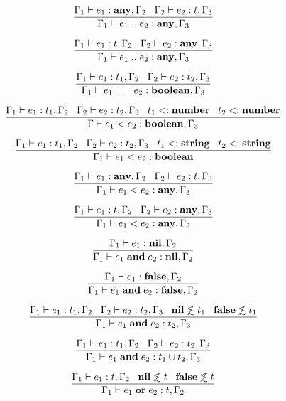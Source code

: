 \[
\dfrac{\Gamma_{1} \vdash e_{1}:\mathbf{any}, \Gamma_{2} \;\;\;
       \Gamma_{2} \vdash e_{2}:t, \Gamma_{3}}
      {\Gamma_{1} \vdash e_{1} \; {..} \; e_{2}:\mathbf{any}, \Gamma_{3}}
\]

\[
\dfrac{\Gamma_{1} \vdash e_{1}:t, \Gamma_{2} \;\;\;
       \Gamma_{2} \vdash e_{2}:\mathbf{any}, \Gamma_{3}}
      {\Gamma_{1} \vdash e_{1} \; {..} \; e_{2}:\mathbf{any}, \Gamma_{3}}
\]

\[
\dfrac{\Gamma_{1} \vdash e_{1}:t_{1}, \Gamma_{2} \;\;\;
       \Gamma_{2} \vdash e_{2}:t_{2}, \Gamma_{3}}
      {\Gamma_{1} \vdash e_{1} == e_{2}:\mathbf{boolean}, \Gamma_{3}}
\]

\[
\dfrac{\Gamma_{1} \vdash e_{1}:t_{1}, \Gamma_{2} \;\;\;
       \Gamma_{2} \vdash e_{2}:t_{2}, \Gamma_{3} \;\;\;
       t_{1} <: \mathbf{number} \;\;\;
       t_{2} <: \mathbf{number}}
      {\Gamma \vdash e_{1} < e_{2}:\mathbf{boolean}, \Gamma_{3}}
\]

\[
\dfrac{\Gamma_{1} \vdash e_{1}:t_{1}, \Gamma_{2} \;\;\;
       \Gamma_{2} \vdash e_{2}:t_{2}, \Gamma_{3} \;\;\;
       t_{1} <: \mathbf{string} \;\;\;
       t_{2} <: \mathbf{string}}
      {\Gamma_{1} \vdash e_{1} < e_{2}:\mathbf{boolean}}
\]

\[
\dfrac{\Gamma_{1} \vdash e_{1}:\mathbf{any}, \Gamma_{2} \;\;\;
       \Gamma_{2} \vdash e_{2}:t, \Gamma_{3}}
      {\Gamma_{1} \vdash e_{1} < e_{2}:\mathbf{any}, \Gamma_{3}}
\]

\[
\dfrac{\Gamma_{1} \vdash e_{1}:t, \Gamma_{2} \;\;\;
       \Gamma_{2} \vdash e_{2}:\mathbf{any}, \Gamma_{3}}
      {\Gamma_{1} \vdash e_{1} < e_{2}:\mathbf{any}, \Gamma_{3}}
\]

\[
\dfrac{\Gamma_{1} \vdash e_{1}:\mathbf{nil}, \Gamma_{2}}
      {\Gamma_{1} \vdash e_{1} \; \mathbf{and} \; e_{2}:\mathbf{nil}, \Gamma_{2}}
\]

\[
\dfrac{\Gamma_{1} \vdash e_{1}:\mathbf{false}, \Gamma_{2}}
      {\Gamma_{1} \vdash e_{1} \; \mathbf{and} \; e_{2}:\mathbf{false}, \Gamma_{2}}
\]

\[
\dfrac{\Gamma_{1} \vdash e_{1}:t_{1}, \Gamma_{2} \;\;\;
       \Gamma_{2} \vdash e_{2}:t_{2}, \Gamma_{3} \;\;\;
       \mathbf{nil} \not\lesssim t_{1} \;\;\;
       \mathbf{false} \not\lesssim t_{1}}
      {\Gamma_{1} \vdash e_{1} \; \mathbf{and} \; e_{2}:t_{2}, \Gamma_{3}}
\]

\[
\dfrac{\Gamma_{1} \vdash e_{1}:t_{1}, \Gamma_{2} \;\;\;
       \Gamma_{2} \vdash e_{2}:t_{2}, \Gamma_{3}}
      {\Gamma_{1} \vdash e_{1} \; \mathbf{and} \; e_{2}:t_{1} \cup t_{2}, \Gamma_{3}}
\]

\[
\dfrac{\Gamma_{1} \vdash e_{1}:t, \Gamma_{2} \;\;\;
       \mathbf{nil} \not\lesssim t \;\;\;
       \mathbf{false} \not\lesssim t}
      {\Gamma_{1} \vdash e_{1} \; \mathbf{or} \; e_{2}:t, \Gamma_{2}}
\]

